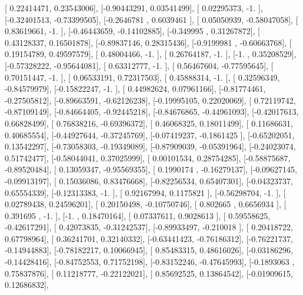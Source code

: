 \documentclass{article}
\begin{document}
       [ 0.22414471,  0.23543006],
       [-0.90443291,  0.03541499],
       [ 0.02295373, -1.        ],
       [-0.32401513, -0.73399505],
       [-0.2646781 ,  0.6039461 ],
       [ 0.05050939, -0.58047058],
       [ 0.83619661, -1.        ],
       [-0.46443659, -0.14102885],
       [-0.349995  ,  0.31267872],
       [ 0.43128337,  0.16501878],
       [-0.89837146,  0.28315436],
       [-0.9199981 , -0.60663768],
       [ 0.19154789,  0.49597579],
       [ 0.48004466, -1.        ],
       [ 0.26764187, -1.        ],
       [-1.        ,  0.35208529],
       [-0.57328222, -0.95644081],
       [ 0.63312777, -1.        ],
       [ 0.56467604, -0.77595645],
       [ 0.70151447, -1.        ],
       [ 0.06533191,  0.72317503],
       [ 0.45888314, -1.        ],
       [ 0.32596349, -0.84579979],
       [-0.15822247, -1.        ],
       [ 0.44982624,  0.07961166],
       [-0.81774461, -0.27505812],
       [-0.89663591, -0.62126238],
       [-0.19995105,  0.22020069],
       [ 0.72119742, -0.87109149],
       [-0.84664405, -0.92445218],
       [-0.84676865, -0.44961093],
       [-0.42017613,  0.66828499],
       [ 0.76838216, -0.69396372],
       [ 0.46068325,  0.18011499],
       [ 0.11686631,  0.40685554],
       [-0.44927644, -0.37245769],
       [-0.07419237, -0.1861425 ],
       [-0.65202051,  0.13542297],
       [-0.73058303, -0.19349089],
       [-0.87909039, -0.05391964],
       [-0.24023074,  0.51742477],
       [-0.58044041,  0.37025999],
       [ 0.00101534,  0.28754285],
       [-0.58875687, -0.89520484],
       [ 0.13059347, -0.95569355],
       [ 0.1990174 , -0.16279137],
       [-0.09627145, -0.09913197],
       [ 0.15036086,  0.83476668],
       [-0.82256534,  0.65407301],
       [-0.04323737,  0.65554339],
       [-0.12313383, -1.        ],
       [ 0.92167994,  0.1175821 ],
       [-0.56298704, -1.        ],
       [ 0.02789438,  0.24596201],
       [ 0.20150498, -0.10750746],
       [ 0.802665  ,  0.6656934 ],
       [ 0.391695  , -1.        ],
       [-1.        ,  0.18470164],
       [ 0.07337611,  0.9028613 ],
       [ 0.59558625, -0.42617291],
       [ 0.42073835, -0.31242537],
       [-0.89933497, -0.210018  ],
       [ 0.20418722,  0.67798964],
       [ 0.36241701,  0.32140332],
       [-0.63441423, -0.76186312],
       [-0.76221737, -0.14944883],
       [-0.78182217,  0.10066945],
       [ 0.85483315,  0.48616026],
       [-0.03186296, -0.14428416],
       [-0.84752553,  0.71752198],
       [-0.83152246, -0.47645993],
       [-0.1893063 ,  0.75837876],
       [ 0.11218777, -0.22122021],
       [ 0.85692525,  0.13864542],
       [-0.01909615,  0.12686832],
\end{document}
